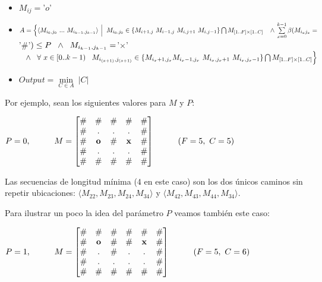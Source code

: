     \begin{itemize}
        \item $ M_{ij} = $'$ o $'$ $
        \item $A = \Big\{ \langle {M_{i_0, j_0}\ ...\ M_{i_{k-1}, j_{k-1}}} \rangle \ \Big | \kern 0.2cm
        M_{i_0,j_0} \in \{M_{i+1,j}\ M_{i-1,j}\ M_{i,j+1}\ M_{i,j-1}\} \bigcap M_{[1..F]\times[1..C]} \kern 0.3cm \wedge \\ \sum\limits_{x=0}^{k-1} \beta(M_{i_x j_x} = $'$\#$'$) \leq P \kern 0.2cm \wedge \kern 0.2cm
        M_{i_{k-1}, j_{k-1}} = $'$\times$'$ \kern 0.3cm \wedge \kern 0.3cm
        \forall\ x \in [0..k-1) \kern 0.3cm M_{i_{(x+1)},j_{(x+1)}} \in \{M_{i_x+1,j_x}\\ M_{i_x-1,j_x}\ M_{i_x,j_x+1}\ M_{i_x,j_x-1}\} \bigcap M_{[1..F]\times[1..C]} \Big\}$
        \item $Output = \min\limits_{C \in A}\ |C|$
    \end{itemize}

Por ejemplo, sean los siguientes valores para $M$ y $P$:
\\
    \begin{center}
        $P=0, \kern 1cm
        M =
        \begin{bmatrix}
            \# & \# & \# & \# & \# \\
            \# & . & . & . & \# \\
            \# & \mathbf{o} & \# & \mathbf{x} & \# \\
            \# & . & . & . & \# \\
            \# & \# & \# & \# & \#
        \end{bmatrix}
        \kern 1cm
        (F = 5,\ C = 5)
        $

    \end{center}

Las secuencias de longitud mínima ($4$ en este caso) son los dos únicos caminos sin repetir ubicaciones: $\langle {M_{22}, M_{23}, M_{24}, M_{34}} \rangle$ y $\langle {M_{42}, M_{43}, M_{44}, M_{34}} \rangle$.

Para ilustrar un poco la idea del parámetro $P$ veamos también este caso:
\\
    \begin{center}
        $P=1, \kern 1cm
        M =
        \begin{bmatrix}
            \#  &   \#         &    \#    &   \#         &   \# & \#    \\
            \#  &   \mathbf{o}  &    \#     & \#          & \mathbf{x}    &   \#    \\
            \#  &   .         &    \#    &    .          &   .  & \#   \\
            \#  &   .          &    .     &   .          &   . & \#    \\
            \#  &   \#         &    \#    &   \#         &   \# & \#
        \end{bmatrix}
        \kern 1cm
        (F = 5,\ C = 6)
        $
    \end{center}

